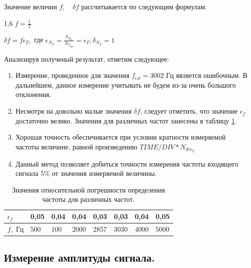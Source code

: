 \documentclass[12pt,a4paper]{article}
\begin{document}
	Значение величин $f,\quad \delta f $ рассчитывается по следующим формулам:
	
	\begin{center}
		\begin{spacing}{1,6}	
			$ f = \frac{1}{T} $	
	
			$ \delta f = f  \epsilon_{T},$ где $ \epsilon_{N_{T}} = \frac{\delta_{N_{T}}}{N_{T_{div}}} = \epsilon_{T}, \delta_{N_{T}} = 1 $
		\end{spacing}
	\end{center}
	
	Анализируя полученый результат, отметим следующее:
	
	\begin{enumerate}
		\item Измерение, проведенное для значения $ f_{ist} = 3002$ Гц является ошибочным. В дальнейшем, данное измерение учитывать не будем из-за очень большого отклонения. 
		\item Несмотря на довольно малые значения $ \delta f $, следует отметить, что значение $ \epsilon_{f} $ достаточно велико. Значения для различных частот занесены в таблицу \ref{tab:epsilon_frequency}.
		\item Хорошая точность обеспечивается при условии кратности измеряемой частоты величине, равной произведению $ TIME/DIV * N_{div_{T}} $
		\item Данный метод позволяет добиться точности измерения частоты входящего сигнала 5$\%$ от значения измеряемой величины.
	\end{enumerate}
	
	\begin{table}[h]
		\begin{center}
			\begin{tabular}{|l|l|l|l|l|l|l|l|}
				\hline
				$\epsilon_{f}$ & 0,05 & 0,04 & 0,04 & 0,03 & 0,03 & 0,04 & 0,05 \\ \hline
				    $f,$ Гц    & 500  & 100  & 2000 & 2857 & 3030 & 4000 & 5000 \\ \hline
			\end{tabular}
			\caption{Значения относительной погрешности определения частоты для различных частот.}
			\label{tab:epsilon_frequency}
		\end{center}
	\end{table}
	
	
	\subsection{Измерение амплитуды сигнала.}
	
\end{document}
